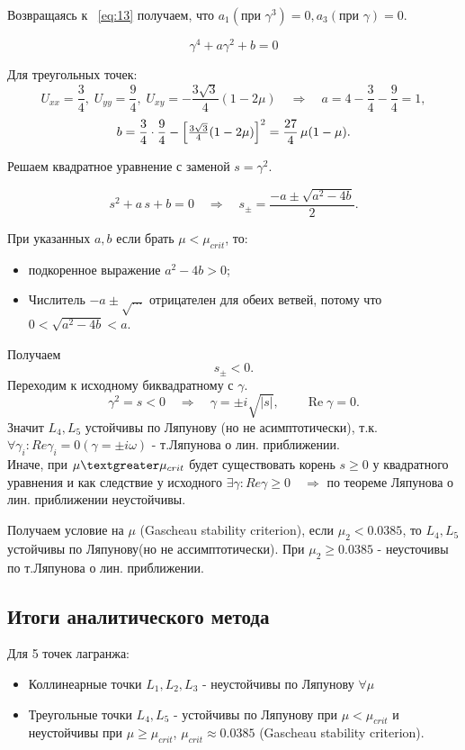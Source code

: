 \documentclass[12pt]{article}
\newcommand{\mutwo}{\mu_2}
\begin{document}
Возвращаясь к ~\eqref{eq:13} получаем, что $a_1(\text{при }\gamma^3) = 0, a_3(\text{при }\gamma) = 0$.

\[\gamma^4+a\gamma^2+b=0\]

Для треугольных точек:
\[
U_{xx}=\frac34,\;
U_{yy}=\frac94,\;
U_{xy}=-\frac{3\sqrt3}{4}(1-2\mu)
\quad\Longrightarrow\quad
a = 4-\frac34-\frac94 = 1,
\]
\[
b=\frac34\cdot\frac94-\Bigl[\tfrac{3\sqrt3}{4}(1-2\mu)\Bigr]^2
  =\frac{27}{4}\,\mu(1-\mu).
\]

Решаем квадратное уравнение с заменой $s=\gamma^{2}$.

\[
s^{2}+a\,s+b=0
\quad\Longrightarrow\quad
s_{\pm}= \frac{-a\pm\sqrt{a^{2}-4b}}{2}.
\]

При указанных $a,b$ если брать $\mu < \mu_{crit}$, то:
\begin{itemize}
    \item подкоренное выражение $a^{2}-4b>0$;
    \item Числитель $-a\pm\sqrt{\dots}$ отрицателен для обеих ветвей, потому что $0<\sqrt{a^{2}-4b}<a$.
\end{itemize}
Получаем
\[
s_{\pm}<0.
\]
Переходим к исходному биквадратному с $\gamma$.
\[
\gamma^{2}=s<0
\quad\Longrightarrow\quad
\gamma=\pm i\sqrt{|s|},
\qquad
\operatorname{Re}\gamma=0.
\]
Значит $L_{4},L_{5}$ устойчивы по Ляпунову (но не асимптотически), т.к. $\forall \gamma_{i}: Re\gamma_{i} = 0(\gamma = \pm i \omega)$ - т.Ляпунова о лин. приближении.\\
Иначе, при $\mu \textgreater\mu_{crit}$ будет существовать корень $s \geqslant 0$ у квадратного уравнения и как следствие у исходного $\exists \gamma: Re\gamma \geqslant 0 \quad \Longrightarrow$ по теореме Ляпунова о лин. приближении неустойчивы. 

Получаем условие на $\mu$ (Gascheau stability criterion), если $\mutwo < 0.0385$, то $L_4,L_5$ устойчивы по Ляпунову(но не ассимптотически). При $\mutwo \geqslant 0.0385$ - неусточивы по т.Ляпунова о лин. приближении.

\bigskip

\subsection{Итоги аналитического метода}

Для 5 точек лагранжа: 
\begin{itemize}
    \item Коллинеарные точки $L_1,L_2,L_3$ - неустойчивы по Ляпунову $\forall \mu$
    \item Треугольные точки $L_4, L_5$ - устойчивы по Ляпунову при $\mu<\mu_{crit}$ и неустойчивы при $\mu \geqslant \mu_{crit}$, $\mu_{crit} \approx 0.0385$ (Gascheau stability criterion).
\end{itemize}
\end{document}
